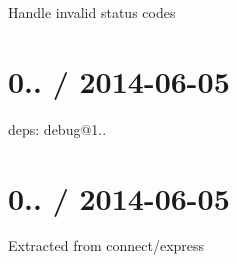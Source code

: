 \begin{DoxyItemize}
\item Handle invalid status codes
\end{DoxyItemize}

\section*{0.. / 2014-\/06-\/05 }


\begin{DoxyItemize}
\item deps\+: debug@1..
\end{DoxyItemize}

\section*{0.. / 2014-\/06-\/05 }


\begin{DoxyItemize}
\item Extracted from connect/express 
\end{DoxyItemize}